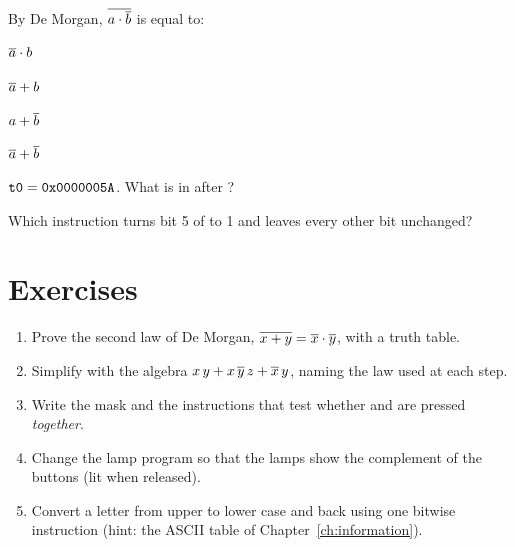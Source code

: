 \begin{quiz}{By De Morgan, $\overline{a\cdot\overline{b}}$ is equal to:}
\item $\overline{a}\cdot b$
\item $\overline{a}+b$
\item $a+\overline{b}$
\item $\overline{a}+\overline{b}$
\end{quiz}

\begin{quiz}{$\texttt{t0}=\texttt{0x0000005A}$. What is in  after ?}
\item {}
\item {}
\item {}
\item {}
\end{quiz}

\begin{quiz}{Which instruction turns bit 5 of  to 1 and leaves every other bit unchanged?}
\item {}
\item {}
\item {}
\item {}
\end{quiz}

\section{Exercises}

\begin{exercise}\label{ex:b1:paper}
\begin{enumerate}[nosep]
\item Prove the second law of De Morgan, $\overline{x+y}=\overline{x}\cdot\overline{y}$,
  with a truth table.
\item Simplify with the algebra $x\,y+x\,\overline{y}\,z+\overline{x}\,y$, naming the
  law used at each step.
\item Write the mask and the instructions that test whether  and
   are pressed \emph{together}.
\item Change the lamp program so that the lamps show the complement of the
  buttons (lit when released).
\item Convert a letter from upper to lower case and back using one bitwise
  instruction (hint: the ASCII table of Chapter~\ref{ch:information}).
\end{enumerate}
\end{exercise}

